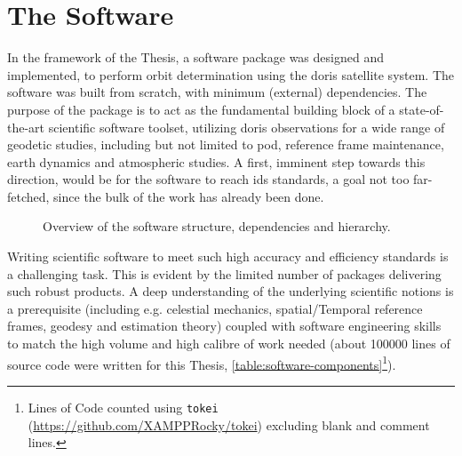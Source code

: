 \section{The Software}\label{sec:the-software}

In the framework of the Thesis, a software package was designed and implemented, to 
perform orbit determination using the \gls{doris} satellite system. The software 
was built from scratch, with minimum (external) dependencies. The purpose of the 
package is to act as the fundamental building block of a state-of-the-art scientific 
software toolset, utilizing \gls{doris} observations for a wide range of geodetic 
studies, including but not limited to \gls{pod}, reference frame maintenance, 
earth dynamics and atmospheric studies. A first, imminent step towards this direction, 
would be for the software to reach \gls{ids} standards, a goal not too far-fetched, 
since the bulk of the work has already been done.

\begin{figure}
  \centering
  
  \caption{Overview of the software structure, dependencies and hierarchy.}
  \label{fig:software-hierarchy}
\end{figure}

Writing scientific software to meet such high accuracy and efficiency standards 
is a challenging task. This is evident by the limited number of packages delivering 
such robust products. A deep understanding of the underlying scientific notions is 
a prerequisite (including e.g. celestial mechanics, spatial/Temporal reference frames, 
geodesy and estimation theory) coupled with software engineering skills to match the 
high volume and high calibre of work needed (about 100000 lines of source code were 
written for this Thesis, \autoref{table:software-components}\footnote{Lines of Code counted using \texttt{tokei} (\url{https://github.com/XAMPPRocky/tokei}) excluding blank and comment lines.}).

